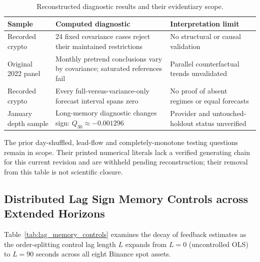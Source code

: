 \documentclass[12pt]{article}
\theoremstyle{definition}
\theoremstyle{remark}
\begin{document}
\begin{table}[htbp]
\centering\footnotesize
\caption{Reconstructed diagnostic results and their evidentiary scope.}
\label{tab:falsification}
\begin{tabularx}{\textwidth}{lXX}\toprule
Sample & Computed diagnostic & Interpretation limit \\\midrule
Recorded crypto & 24 fixed covariance cases reject their maintained restrictions & No structural or causal validation \\
Original 2022 panel & Monthly pretrend conclusions vary by covariance; saturated references fail & Parallel counterfactual trends unvalidated \\
Recorded crypto & Every full-versus-variance-only forecast interval spans zero & No proof of absent regimes or equal forecasts \\
January depth sample & Long-memory diagnostic changes sign: $Q_{30}\approx-0.001296$ & Provider and untouched-holdout status unverified \\\bottomrule
\end{tabularx}
\end{table}
The prior day-shuffled, lead-flow and completely-monotone testing questions remain in scope. Their printed numerical literals lack a verified generating chain for this current revision and are withheld pending reconstruction; their removal from this table is not scientific closure.


\subsection{Distributed Lag Sign Memory Controls across Extended Horizons}
Table~\ref{tab:lag_memory_controls} examines the decay of feedback estimates as the order-splitting control lag length $L$ expands from $L=0$ (uncontrolled OLS) to $L=90$ seconds across all eight Binance spot assets.
\end{document}
